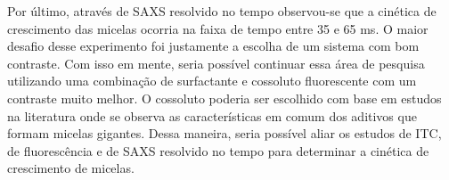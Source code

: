 	Por último, através de SAXS resolvido no tempo observou-se que a cinética de crescimento das micelas ocorria na faixa de tempo entre 35 e 65 ms. O maior desafio desse experimento foi justamente a escolha de um sistema com bom contraste. Com isso em mente, seria possível continuar essa área de pesquisa utilizando uma combinação de surfactante e cossoluto fluorescente com um contraste muito melhor. O cossoluto poderia ser escolhido com base em estudos na literatura onde se observa as características em comum dos aditivos que formam micelas gigantes. Dessa maneira, seria possível aliar os estudos de ITC, de fluorescência e de SAXS resolvido no tempo para determinar a cinética de crescimento de micelas.
	
	
